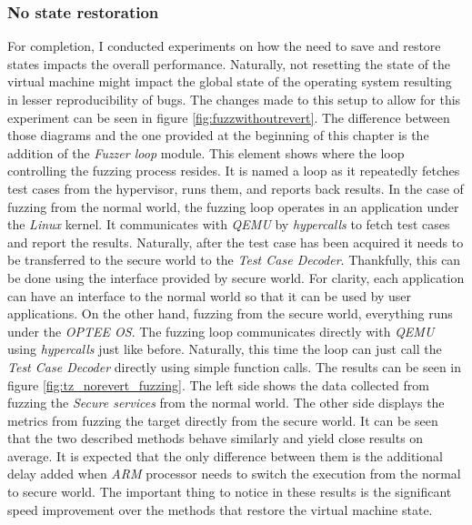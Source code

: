 \subsubsection{No state restoration}
For completion, I conducted experiments on how the need to save and restore states impacts the overall performance. Naturally, not resetting the state of the virtual machine might impact the global state of the operating system resulting in lesser reproducibility of bugs. 
The changes made to this setup to allow for this experiment can be seen in figure \ref{fig:fuzzwithoutrevert}. The difference between those diagrams and the one provided at the beginning of this chapter is the addition of the \textit{Fuzzer loop} module. This element shows where the loop controlling the fuzzing process resides. It is named a loop as it repeatedly fetches test cases from the hypervisor, runs them, and reports back results. In the case of fuzzing from the normal world, the fuzzing loop operates in an application under the \textit{Linux} kernel. It communicates with \textit{QEMU} by \textit{hypercalls} to fetch test cases and report the results. Naturally, after the test case has been acquired it needs to be transferred to the secure world to the \textit{Test Case Decoder}. Thankfully, this can be done using the interface provided by secure world. For clarity, each application can have an interface to the normal world so that it can be used by user applications. On the other hand, fuzzing from the secure world, everything runs under the \textit{OPTEE OS}. The fuzzing loop communicates directly with \textit{QEMU} using \textit{hypercalls} just like before. Naturally, this time the loop can just call the \textit{Test Case Decoder} directly using simple function calls. The results can be seen in figure \ref{fig:tz_norevert_fuzzing}. The left side shows the data collected from fuzzing the \textit{Secure services} from the normal world. The other side displays the metrics from fuzzing the target directly from the secure world. It can be seen that the two described methods behave similarly and yield close results on average. It is expected that the only difference between them is the additional delay added when \textit{ARM} processor needs to switch the execution from the normal to secure world. The important thing to notice in these results is the significant speed improvement over the methods that restore the virtual machine state. 

